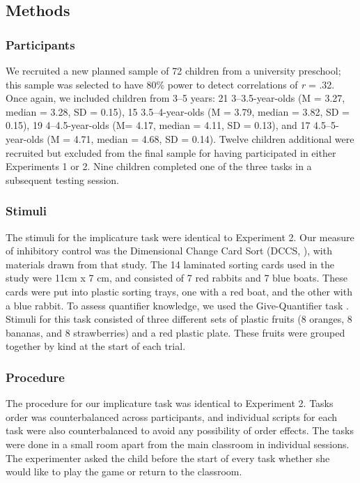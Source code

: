 \documentclass[man]{apa2}
\begin{document}
\subsection{Methods}
\subsubsection{Participants} We recruited a new planned sample of 72 children from a university preschool; this sample was selected to have 80\% power to detect correlations of \emph{r} = .32. Once again, we included children from 3--5 years: 21 3--3.5-year-olds (M = 3.27, median = 3.28, SD = 0.15), 15 3.5--4-year-olds (M = 3.79, median = 3.82, SD = 0.15), 19 4--4.5-year-olds (M= 4.17, median = 4.11, SD = 0.13), and 17 4.5--5-year-olds (M = 4.71, median = 4.68, SD = 0.14). Twelve children additional were recruited but excluded from the final sample for having participated in either Experiments 1 or 2. Nine children completed one of the three tasks in a subsequent testing session. 

\subsubsection{Stimuli} The stimuli for the implicature task were identical to Experiment 2. Our measure of inhibitory control was the Dimensional Change Card Sort (DCCS, \cite{zelazo2006}), with materials drawn from that study. The 14 laminated sorting cards used in the study were 11cm x 7 cm, and consisted of 7 red rabbits and 7 blue boats. These cards were put into plastic sorting trays, one with a red boat, and the other with a blue rabbit. To assess quantifier knowledge, we used the Give-Quantifier task \cite{barner2009}. Stimuli for this task consisted of three different sets of plastic fruits (8 oranges, 8 bananas, and 8 strawberries) and a red plastic plate. These fruits were grouped together by kind at the start of each trial. 

\subsubsection{Procedure}
The procedure for our implicature task was identical to Experiment 2. Tasks order was counterbalanced across participants, and individual scripts for each task were also counterbalanced to avoid any possibility of order effects. The tasks were done in a small room apart from the main classroom in individual sessions. The experimenter asked the child before the start of every task whether she would like to play the game or return to the classroom. 
\end{document}
